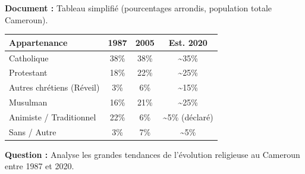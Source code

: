 \documentclass[11pt]{article}
\begin{document}
\begin{exoresolu}
\textbf{Document :} Tableau simplifié (pourcentages arrondis, population totale Cameroun).
\begin{center}
\begin{tabular}{|l|c|c|c|}\hline
\rowcolor{popblueL}
\textbf{Appartenance} & \textbf{1987} & \textbf{2005} & \textbf{Est. 2020} \\ \hline
Catholique & 38\% & 38\% & \textasciitilde 35\% \\ \hline
Protestant & 18\% & 22\% & \textasciitilde 25\% \\ \hline
Autres chrétiens (Réveil) & 3\% & 6\% & \textasciitilde 15\% \\ \hline
Musulman & 16\% & 21\% & \textasciitilde 25\% \\ \hline
Animiste / Traditionnel & 22\% & 6\% & \textasciitilde 5\% (déclaré) \\ \hline
Sans / Autre & 3\% & 7\% & \textasciitilde 5\% \\ \hline
\end{tabular}
\end{center}

\textbf{Question :} Analyse les grandes tendances de l'évolution religieuse au Cameroun entre 1987 et 2020.


\end{exoresolu}
\end{document}
